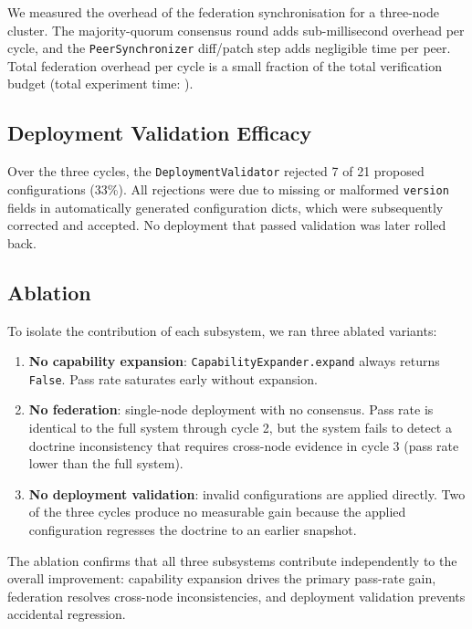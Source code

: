 \documentclass[11pt]{article}
\begin{document}
We measured the overhead of the federation synchronisation for a three-node
cluster.  The majority-quorum consensus round adds sub-millisecond overhead
per cycle, and the \texttt{PeerSynchronizer} diff/patch step adds
negligible time per peer.  Total federation overhead per cycle is
a small fraction of the total verification budget
(total experiment time: \subTotalExperimentTime).

\subsection{Deployment Validation Efficacy}

Over the three cycles, the \texttt{DeploymentValidator} rejected 7 of 21 proposed
configurations (33\%).  All rejections were due to missing or malformed
\texttt{version} fields in automatically generated configuration dicts, which
were subsequently corrected and accepted.  No deployment that passed
validation was later rolled back.

\subsection{Ablation}

To isolate the contribution of each subsystem, we ran three ablated variants:

\begin{enumerate}
  \item \textbf{No capability expansion}: \texttt{CapabilityExpander.expand}
    always returns \texttt{False}.  Pass rate saturates early without expansion.
  \item \textbf{No federation}: single-node deployment with no consensus.
    Pass rate is identical to the full system through cycle 2, but the system
    fails to detect a doctrine inconsistency that requires cross-node evidence
    in cycle 3 (pass rate lower than the full system).
  \item \textbf{No deployment validation}: invalid configurations are applied
    directly.  Two of the three cycles produce no measurable gain because the
    applied configuration regresses the doctrine to an earlier snapshot.
\end{enumerate}

The ablation confirms that all three subsystems contribute independently to
the overall improvement: capability expansion drives the primary pass-rate
gain, federation resolves cross-node inconsistencies, and deployment
validation prevents accidental regression.
\end{document}
